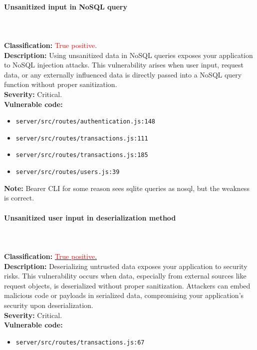 \documentclass[]{article}
\begin{document}
\paragraph{Unsanitized input in NoSQL query} \mbox{} \\ \\
\textbf{Classification:} \textcolor{red}{True} \textcolor{red}{positive}. \\
\textbf{Description:} Using unsanitized data in NoSQL queries exposes your application to NoSQL injection attacks. This vulnerability arises when user input, request data, or any externally influenced data is directly passed into a NoSQL query function without proper sanitization. \\
\textbf{Severity:} Critical. \\ 
\textbf{Vulnerable code:}
\begin{itemize}
    \item \texttt{server/src/routes/authentication.js:148}
    \item \texttt{server/src/routes/transactions.js:111}
    \item \texttt{server/src/routes/transactions.js:185}
    \item \texttt{server/src/routes/users.js:39}
\end{itemize}
\textbf{Note:} Bearer CLI for some reason sees sqlite queries as nosql, but the weakness is correct.

\paragraph{Unsanitized user input in deserialization method} \mbox{} \\ \\
\textbf{Classification:} \hyperref[subsubsec:deserialization_of_untrusted_data]{\textcolor{red}{True} \textcolor{red}{positive}.} \\
\textbf{Description:} Deserializing untrusted data exposes your application to security risks. This vulnerability occurs when data, especially from external sources like request objects, is deserialized without proper sanitization. Attackers can embed malicious code or payloads in serialized data, compromising your application's security upon deserialization. \\ 
\textbf{Severity:} Critical. \\ 
\textbf{Vulnerable code:}
\begin{itemize}
    \item \texttt{server/src/routes/transactions.js:67}
\end{itemize}
\end{document}
